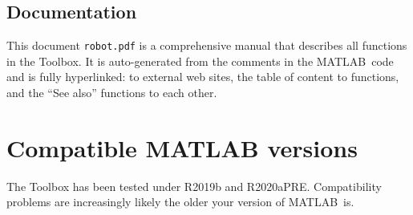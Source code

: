 \documentclass[a4paper,twoside]{report}
\def\Mlab{MATLAB}
\begin{document}
\subsection{Documentation}
This document {\tt robot.pdf} is a comprehensive manual that describes all functions in the Toolbox.
It is auto-generated from the comments in the \Mlab\ code and is fully hyperlinked:
to external web sites, the table of content to functions, and the ``See also'' functions
to each other.



\section{Compatible MATLAB versions}
The Toolbox has been tested under R2019b and R2020aPRE.  Compatibility problems are increasingly likely the older your version of \Mlab\ is.
\end{document}
